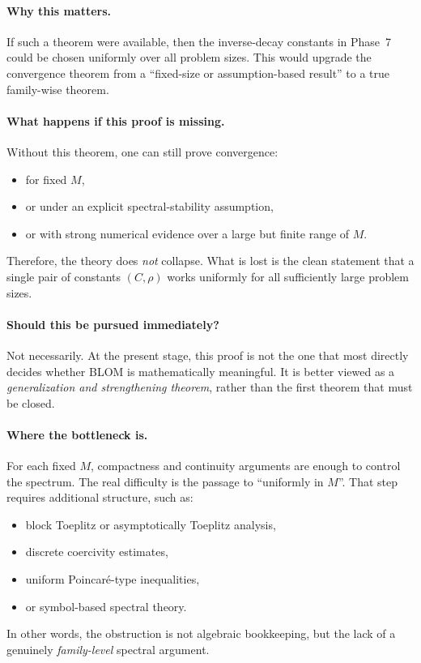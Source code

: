 \paragraph{Why this matters.}
If such a theorem were available, then the inverse-decay constants in Phase~7 could be chosen uniformly over all problem sizes.
This would upgrade the convergence theorem from a ``fixed-size or assumption-based result'' to a true family-wise theorem.

\paragraph{What happens if this proof is missing.}
Without this theorem, one can still prove convergence:
\begin{itemize}
	\item for fixed \(M\),
	\item or under an explicit spectral-stability assumption,
	\item or with strong numerical evidence over a large but finite range of \(M\).
\end{itemize}
Therefore, the theory does \emph{not} collapse.
What is lost is the clean statement that a single pair of constants \((C,\rho)\) works uniformly for all sufficiently large problem sizes.

\paragraph{Should this be pursued immediately?}
Not necessarily.
At the present stage, this proof is not the one that most directly decides whether BLOM is mathematically meaningful.
It is better viewed as a \emph{generalization and strengthening theorem}, rather than the first theorem that must be closed.

\paragraph{Where the bottleneck is.}
For each fixed \(M\), compactness and continuity arguments are enough to control the spectrum.
The real difficulty is the passage to ``uniformly in \(M\)''.
That step requires additional structure, such as:
\begin{itemize}
	\item block Toeplitz or asymptotically Toeplitz analysis,
	\item discrete coercivity estimates,
	\item uniform Poincar\'e-type inequalities,
	\item or symbol-based spectral theory.
\end{itemize}
In other words, the obstruction is not algebraic bookkeeping, but the lack of a genuinely \emph{family-level} spectral argument.

